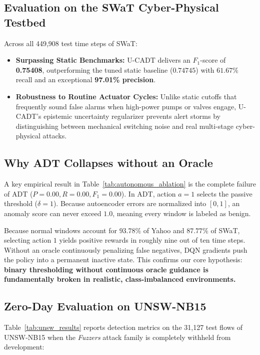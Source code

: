 \documentclass[conference]{IEEEtran}
\begin{document}
\subsection{Evaluation on the SWaT Cyber-Physical Testbed}
Across all 449,908 test time steps of SWaT:
\begin{itemize}
    \item \textbf{Surpassing Static Benchmarks:} U-CADT delivers an $F_1$-score of \textbf{0.75408}, outperforming the tuned static baseline ($0.74745$) with $61.67\%$ recall and an exceptional \textbf{97.01\% precision}.
    \item \textbf{Robustness to Routine Actuator Cycles:} Unlike static cutoffs that frequently sound false alarms when high-power pumps or valves engage, U-CADT's epistemic uncertainty regularizer prevents alert storms by distinguishing between mechanical switching noise and real multi-stage cyber-physical attacks.
\end{itemize}

\subsection{Why ADT Collapses without an Oracle}
A key empirical result in Table~\ref{tab:autonomous_ablation} is the complete failure of ADT ($P = 0.00, R = 0.00, F_1 = 0.00$). In ADT, action $a=1$ selects the passive threshold ($\delta=1$). Because autoencoder errors are normalized into $[0, 1]$, an anomaly score can never exceed $1.0$, meaning every window is labeled as benign.

Because normal windows account for $93.78\%$ of Yahoo and $87.77\%$ of SWaT, selecting action $1$ yields positive rewards in roughly nine out of ten time steps. Without an oracle continuously penalizing false negatives, DQN gradients push the policy into a permanent inactive state. This confirms our core hypothesis: \textbf{binary thresholding without continuous oracle guidance is fundamentally broken in realistic, class-imbalanced environments.}

\subsection{Zero-Day Evaluation on UNSW-NB15}
Table~\ref{tab:unsw_results} reports detection metrics on the 31,127 test flows of UNSW-NB15 when the \textit{Fuzzers} attack family is completely withheld from development:
\end{document}
